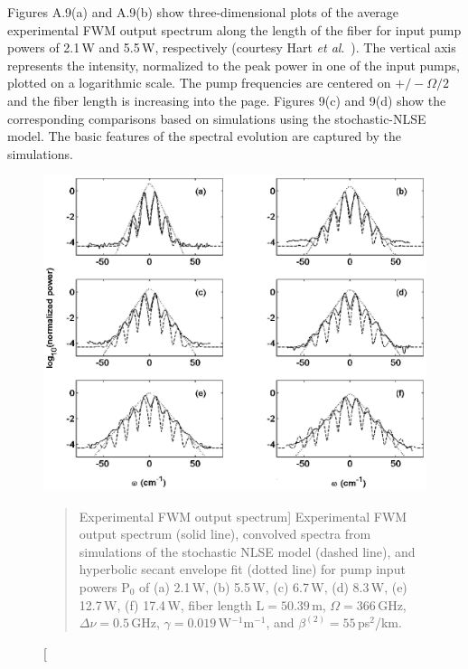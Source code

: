 Figures A.9(a) and A.9(b) show three-dimensional plots of the average experimental
FWM output spectrum along the length of the fiber for input pump powers of 2.1\,W and 5.5\,W,
 respectively (courtesy Hart {\it et al}.\ \cite{hart1}). The vertical
axis represents the intensity, normalized to the peak power in one of the
input pumps, plotted on a logarithmic scale. The pump frequencies are centered
on $+/-\Omega/2$ and the fiber length is increasing into the page. Figures
9(c) and 9(d) show the corresponding comparisons based on simulations using
the stochastic-NLSE model. The basic features of the spectral evolution are
captured by the simulations.

\begin{figure}
\begin{center}
\includegraphics[width=5in]{nlsespec.eps}
\end{center}
\renewcommand{\baselinestretch}{1}
\small\normalsize
\begin{quote}
\caption
[Experimental FWM output spectrum]
{Experimental FWM output spectrum (solid line), convolved spectra from simulations of the stochastic NLSE model (dashed line), and hyperbolic secant envelope fit (dotted line) for pump input powers P$_0$ of (a) 2.1\,W, (b) 5.5\,W, (c) 6.7\,W, (d) 8.3\,W, (e) 12.7\,W, (f) 17.4\,W, fiber length L$= 50.39$\,m, $\Omega = 366$\,GHz, $\Delta\nu = 0.5$\,GHz, $\gamma = 0.019$\,W$^{-1}$m$^{-1}$, and $\beta^{(2)} = 55$\,ps$^2$/km.}
\label{figA.10}
\end{quote}
\end{figure}
\renewcommand{\baselinestretch}{2}
\small\normalsize

